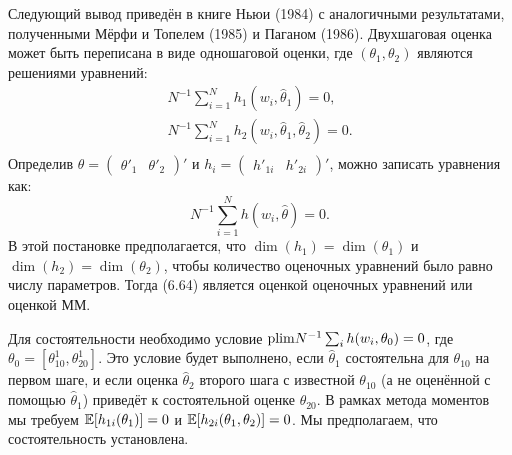 Следующий вывод приведён в книге Ньюи (1984) с аналогичными результатами, полученными Мёрфи и Топелем (1985) и Паганом (1986). Двухшаговая оценка может быть переписана в виде одношаговой оценки, где $(\theta_1,\theta_2)$  являются решениями уравнений:
\begin{equation}
\begin{split}
N^{-1} \sum_{i=1}^{N} h_1(w_i,\hat{\theta}_1)=0, \\
N^{-1} \sum_{i=1}^{N} h_2(w_i,\hat{\theta}_1,\hat{\theta}_2)=0.\\
\end{split}
\end{equation}
Определив $\theta=(\begin{matrix} \theta'_1 & \theta'_2 \end{matrix})'$ и $h_i=(\begin{matrix} h'_{1i} & h'_{2i} \end{matrix})'$, можно записать уравнения как:
\[
N^{-1} \sum_{i=1}^{N} h(w_i,\hat{\theta})=0.
\]
В этой постановке предполагается, что $\dim(h_1)=\dim(\theta_1)$ и $\dim(h_2)=\dim(\theta_2)$, чтобы количество оценочных уравнений было равно числу параметров. Тогда (6.64) является оценкой оценочных уравнений или оценкой ММ.

Для состоятельности необходимо условие  $\mathrm{plim } N^{-1} \sum_i h(w_i,\theta_0)=0$, где $\theta_0=[\theta^1_{10},\theta^1_{20}]$. Это условие будет выполнено, если $\hat{\theta}_1$ состоятельна для $\theta_{10}$ на первом шаге, и если оценка $\hat{\theta}_2$ второго шага с известной $\theta_{10}$ (а не оценённой с помощью $\hat{\theta}_1$) приведёт к состоятельной оценке $\theta_{20}$. В рамках метода моментов мы требуем $\mathbb{E}[h_{1i}(\theta_1)]=0$ и $\mathbb{E}[h_{2i}(\theta_1,\theta_2)]=0$. Мы предполагаем, что состоятельность установлена.

